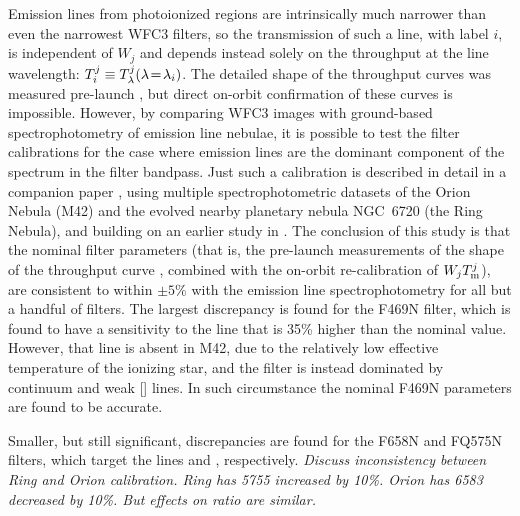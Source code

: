 \documentclass[preprint]{aastex}
\begin{document}
Emission lines from photoionized regions are intrinsically much
narrower than even the narrowest WFC3 filters, so the transmission of
such a line, with label \(i\), is independent of \(W_j\) and depends
instead solely on the throughput at the line wavelength: \(T_{i}^{j}
\equiv T_{\lambda}^{j}(\lambda\!=\!\lambda_i)\).  The detailed shape of the
throughput curves was measured pre-launch \citep{Brown:2006a}, but
direct on-orbit confirmation of these curves is impossible.  However,
by comparing WFC3 images with ground-based spectrophotometry of
emission line nebulae, it is possible to test the filter calibrations
for the case where emission lines are the dominant component of the
spectrum in the filter bandpass.  Just such a calibration is described
in detail in a companion paper \citep{Henney:Calibration}, using
multiple spectrophotometric datasets of the Orion Nebula (M42) and the
evolved nearby planetary nebula NGC~6720 (the Ring Nebula), and
building on an earlier study in \citet{ODell:2013b}.  The conclusion
of this study is that the nominal filter parameters (that is, the
pre-launch measurements of the shape of the throughput curve ,
combined with the on-orbit re-calibration of \(W_j T_{\mathrm{m}}^{j}\)), are
consistent to within \(\pm 5\%\) with the emission line
spectrophotometry for all but a handful of filters.  The largest
discrepancy is found for the F469N filter, which is found to have a
sensitivity to the   line that is 35\% higher than the
nominal value.  However, that line is absent in M42, due to the
relatively low effective temperature of the ionizing star, and the
filter is instead dominated by continuum and weak []
lines.  In such circumstance the nominal F469N parameters are found to
be accurate.  

Smaller, but still significant, discrepancies are found for the F658N
and FQ575N filters, which target the \nii{} lines  and
, respectively. \textit{Discuss inconsistency between Ring
  and Orion calibration.  Ring has 5755 increased by 10\%.  Orion has
  6583 decreased by 10\%.  But effects on ratio are similar.}
\end{document}
